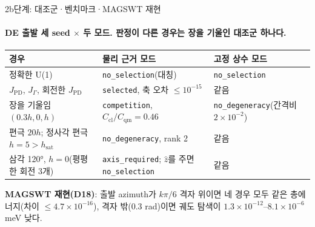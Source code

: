 \begin{frame}[label=stage2b-controls]{2b단계: 대조군·벤치마크·MAGSWT 재현}
  \framesubtitle{DE 출발 세 seed $\times$ 두 모드. 판정이 다른 경우는 장을 기울인 대조군 하나다.}
  \small
  \begin{tabularx}{\textwidth}{@{}YP{2.9cm}P{2.9cm}@{}}
    \toprule
    경우 & 물리 근거 모드 & 고정 상수 모드 \\
    \midrule
    정확한 U(1) & \texttt{no\_selection}(대칭) & \texttt{no\_selection} \\
    $J_{\mathrm{PD}}$, $J_\Gamma$, 회전한 $J_{\mathrm{PD}}$ & \texttt{selected}, 축 오차 $\le10^{-15}$ & 같음 \\
    장을 기울임 $(0.3h,0,h)$ & \texttt{competition}, $C_{\mathrm{cl}}/C_{\mathrm{qm}}=0.46$ & \texttt{no\_degeneracy}(간격비 $2\times10^{-2}$) \\
    편극 $20h$; 정사각 편극 $h=5>h_{\mathrm{sat}}$ & \texttt{no\_degeneracy}, rank 2 & 같음 \\
    삼각 120°, $h=0$(평평한 회전 3개) & \texttt{axis\_required}; $\hat z$를 주면 \texttt{no\_selection} & 같음 \\
    \bottomrule
  \end{tabularx}
  \par\smallskip
  \textbf{MAGSWT 재현(D18)}: 출발 azimuth가 $k\pi/6$ 격자 위이면 네 경우 모두 같은 총에너지(차이 $\le4.7\times10^{-16}$),
  격자 밖(0.3 rad)이면 궤도 탐색이 $1.3\times10^{-12}$--$8.1\times10^{-6}$ meV 낮다.
  \par\smallskip
\end{frame}

